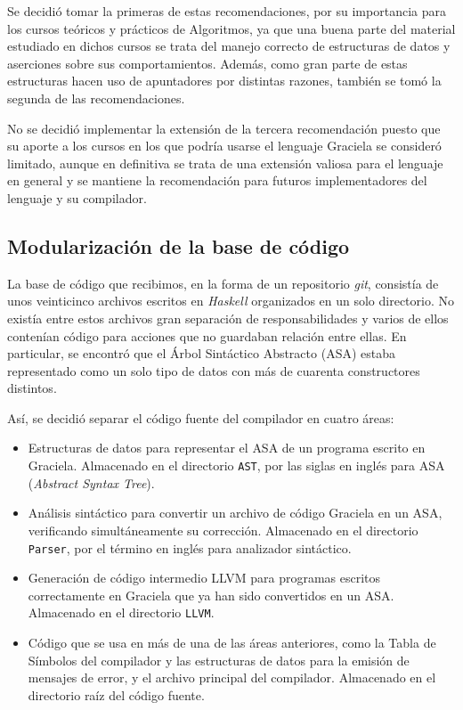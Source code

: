 Se decidió tomar la primeras de estas recomendaciones, por su importancia para
los cursos teóricos y prácticos de Algoritmos, ya que una buena parte del
material estudiado en dichos cursos se trata del manejo correcto de estructuras
de datos y aserciones sobre sus comportamientos. Además, como gran parte de
estas estructuras hacen uso de apuntadores por distintas razones, también se
tomó la segunda de las recomendaciones.

No se decidió implementar la extensión de la tercera recomendación puesto que su
aporte a los cursos en los que podría usarse el lenguaje Graciela se consideró
limitado, aunque en definitiva se trata de una extensión valiosa para el
lenguaje en general y se mantiene la recomendación para futuros
implementadores del lenguaje y su compilador.

\subsection{Modularización de la base de código}

La base de código que recibimos, en la forma de un repositorio \emph{git},
consistía de unos veinticinco archivos escritos en \emph{Haskell} organizados en
un solo directorio. No existía entre estos archivos gran separación de
responsabilidades y varios de ellos contenían código para acciones que no
guardaban relación entre ellas. En particular, se encontró que el Árbol
Sintáctico Abstracto (\textsc{ASA}) estaba representado como un solo tipo de
datos con más de cuarenta constructores distintos.

Así, se decidió separar el código fuente del compilador en cuatro áreas:
\begin{itemize}

  \item Estructuras de datos para representar el \textsc{ASA} de un programa
  escrito en Graciela. Almacenado en el directorio \texttt{AST}, por las siglas
  en inglés para \textsc{ASA} (\emph{Abstract Syntax Tree}).

  \item Análisis sintáctico para convertir un archivo de código Graciela en un
  ASA, verificando simultáneamente su corrección. Almacenado en el directorio
  \texttt{Parser}, por el término en inglés para analizador sintáctico.

  \item Generación de código intermedio LLVM para programas escritos
  correctamente en Graciela que ya han sido convertidos en un ASA. Almacenado en el
  directorio \texttt{LLVM}.

  \item Código que se usa en más de una de las áreas anteriores, como la Tabla
  de Símbolos del compilador y las estructuras de datos para la emisión de
  mensajes de error, y el archivo principal del compilador. Almacenado en el
  directorio raíz del código fuente.

\end{itemize}

